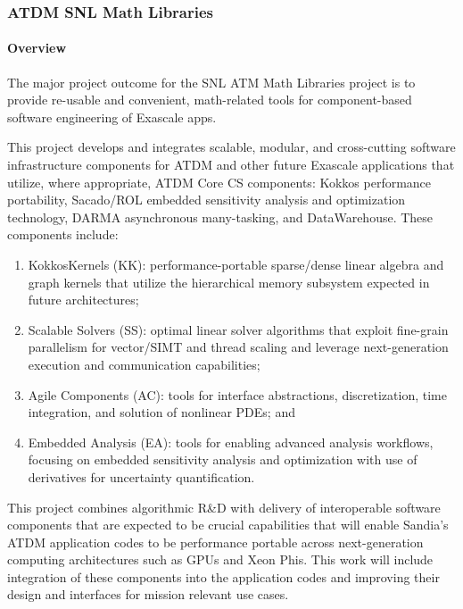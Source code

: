 \subsubsection{ATDM SNL Math Libraries} \label{subsubsect:trilinos}

\paragraph{Overview} 
The major project outcome for the SNL ATM Math Libraries project is to provide re-usable and convenient, math-related tools for component-based software engineering of Exascale apps.

This project develops and integrates scalable, modular, and cross-cutting software infrastructure components for ATDM and other future Exascale applications that utilize, where appropriate, ATDM Core CS components: Kokkos performance portability, Sacado/ROL embedded sensitivity analysis and optimization technology, DARMA asynchronous many-tasking, and DataWarehouse.  These components include:
\begin{enumerate}
\item	KokkosKernels (KK):  performance-portable sparse/dense linear algebra and graph kernels that utilize the hierarchical memory subsystem expected in future architectures;
\item	Scalable Solvers (SS):  optimal linear solver algorithms that exploit fine-grain parallelism for vector/SIMT and thread scaling and leverage next-generation execution and communication capabilities;
\item	Agile Components (AC):  tools for interface abstractions, discretization, time integration, and solution of nonlinear PDEs; and 
\item Embedded Analysis (EA):  tools for enabling advanced analysis workflows, focusing on embedded sensitivity analysis and optimization with use of derivatives for uncertainty quantification.
\end{enumerate}

This project combines algorithmic R\&D with delivery of interoperable software components that are expected to be crucial capabilities that will enable Sandia's ATDM application codes to be performance portable across next-generation computing architectures such as GPUs and Xeon Phis.  This work will include integration of these components into the application codes and improving their design and interfaces for mission relevant use cases.	


